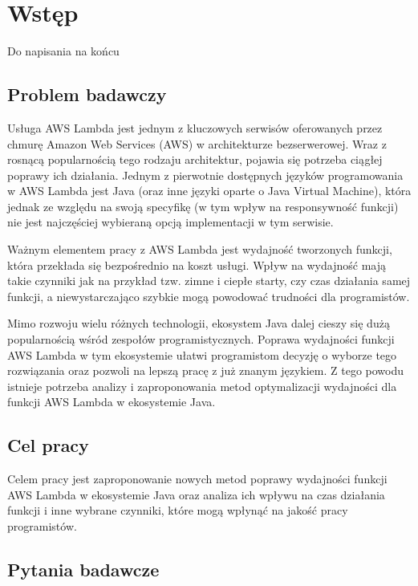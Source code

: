 \chapter*{Wstęp}\label{chapter:wstep}

Do napisania na końcu

\section*{Problem badawczy}\label{chapter:problem_badawczy}

Usługa AWS Lambda jest jednym z kluczowych serwisów oferowanych przez chmurę Amazon Web Services (AWS) w architekturze bezserwerowej. Wraz z rosnącą popularnością tego rodzaju architektur, pojawia się potrzeba ciągłej poprawy ich działania. Jednym z pierwotnie dostępnych języków programowania w AWS Lambda jest Java (oraz inne języki oparte o Java Virtual Machine), która jednak ze względu na swoją specyfikę (w tym wpływ na responsywność funkcji) nie jest najczęściej wybieraną opcją implementacji w tym serwisie.

Ważnym elementem pracy z AWS Lambda jest wydajność tworzonych funkcji, która przekłada się bezpośrednio na koszt usługi. Wpływ na wydajność mają takie czynniki jak na przykład tzw. zimne i ciepłe starty, czy czas działania samej funkcji, a niewystarczająco szybkie mogą powodować trudności dla programistów.

Mimo rozwoju wielu różnych technologii, ekosystem Java dalej cieszy się dużą popularnością wśród zespołów programistycznych. Poprawa wydajności funkcji AWS Lambda w tym ekosystemie ułatwi programistom decyzję o wyborze tego rozwiązania oraz pozwoli na lepszą pracę z już znanym językiem. Z tego powodu istnieje potrzeba analizy i zaproponowania metod optymalizacji wydajności dla funkcji AWS Lambda w ekosystemie Java.

\section*{Cel pracy}\label{chapter:cel_pracy}

Celem pracy jest zaproponowanie nowych metod poprawy wydajności funkcji AWS Lambda w ekosystemie Java oraz analiza ich wpływu na czas działania funkcji i inne wybrane czynniki, które mogą wpłynąć na jakość pracy programistów. 

\section*{Pytania badawcze}\label{chapter:pytania_badawcze}

